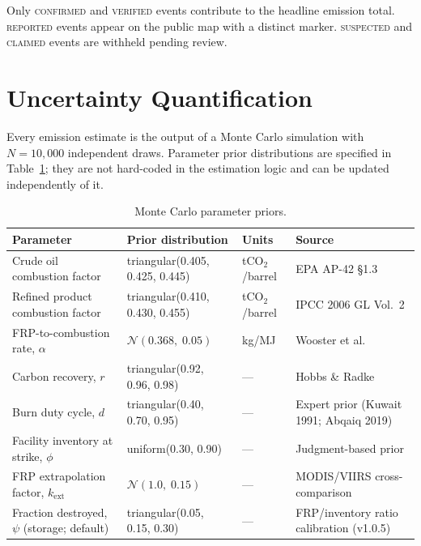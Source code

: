 \documentclass[11pt]{article}
\begin{document}
Only \textsc{confirmed} and \textsc{verified} events contribute to the
headline emission total. \textsc{reported} events appear on the public map
with a distinct marker. \textsc{suspected} and \textsc{claimed} events are
withheld pending review.

\section{Uncertainty Quantification}
\label{sec:uq}

Every emission estimate is the output of a Monte Carlo simulation with
$N = 10{,}000$ independent draws. Parameter prior distributions are
specified in Table~\ref{tab:priors}; they are not hard-coded in the
estimation logic and can be updated independently of it.

\begin{table}[h]
\centering
\caption{Monte Carlo parameter priors.}
\label{tab:priors}
\begin{tabular}{@{}llll@{}}
\toprule
\textbf{Parameter} & \textbf{Prior distribution} & \textbf{Units} &
\textbf{Source} \\
\midrule
Crude oil combustion factor
  & triangular(0.405, 0.425, 0.445)
  & tCO$_2$/barrel & EPA AP-42 \S1.3 \cite{ap42} \\
Refined product combustion factor
  & triangular(0.410, 0.430, 0.455)
  & tCO$_2$/barrel & IPCC 2006 GL Vol.~2 \cite{ipcc2006} \\
FRP-to-combustion rate, $\alpha$
  & $\mathcal{N}(0.368,\;0.05)$
  & kg/MJ & Wooster et al.~\cite{wooster2005} \\
Carbon recovery, $r$
  & triangular(0.92, 0.96, 0.98)
  & --- & Hobbs \& Radke~\cite{hobbs1992} \\
Burn duty cycle, $d$
  & triangular(0.40, 0.70, 0.95)
  & --- & Expert prior (Kuwait 1991; Abqaiq 2019) \\
Facility inventory at strike, $\phi$
  & uniform(0.30, 0.90)
  & --- & Judgment-based prior \\
FRP extrapolation factor, $k_{\mathrm{ext}}$
  & $\mathcal{N}(1.0,\;0.15)$
  & --- & MODIS/VIIRS cross-comparison \\
Fraction destroyed, $\psi$ (storage; default)
  & triangular(0.05, 0.15, 0.30)
  & --- & FRP/inventory ratio calibration (v1.0.5) \\
\bottomrule
\end{tabular}
\end{table}
\end{document}
